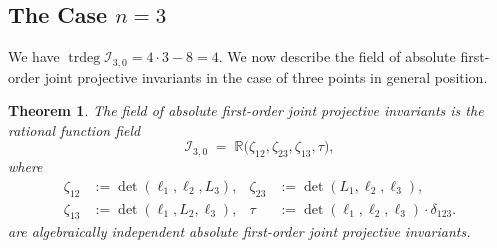 \documentclass[12pt,reqno]{amsart}
\newtheorem{theorem}{Theorem}
\begin{document}
\subsection{The Case \(n=3\)}
We have  $
\operatorname{trdeg} \mathcal I_{3,0}=4\cdot3-8=4.
$
We now describe the field of absolute first-order joint projective invariants in the case of three points in general position.

\begin{theorem}
\label{thm:n3}
The field of absolute first-order joint projective invariants is the rational function field
\[
\mathcal{I}_{3,0}
\;=\;
\mathbb{R}\bigl(\zeta_{12},\zeta_{23},\zeta_{13},\tau\bigr),
\]
where
\[
\begin{aligned}
\zeta_{12} &:= \det(\ell_1, \ell_2, L_3), &
\zeta_{23} &:= \det(L_1, \ell_2, \ell_3), \\[4pt]
\zeta_{13} &:= \det(\ell_1, L_2, \ell_3), &
\tau    &:= \det(\ell_1, \ell_2, \ell_3)\cdot \delta_{123}.
\end{aligned}
\]
 are algebraically independent   absolute first-order joint projective invariants. 
\end{theorem}
\end{document}
